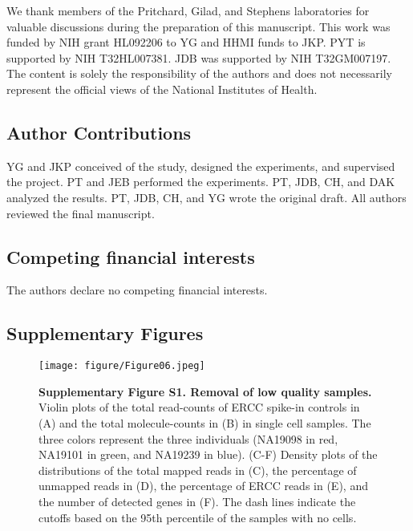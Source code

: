 We thank members of the Pritchard, Gilad, and Stephens laboratories for
valuable discussions during the preparation of this manuscript. This
work was funded by NIH grant HL092206 to YG and HHMI funds to JKP. PYT
is supported by NIH T32HL007381. JDB was supported by NIH T32GM007197.
The content is solely the responsibility of the authors and does not
necessarily represent the official views of the National Institutes of
Health.

\subsection{Author Contributions}\label{author-contributions}

YG and JKP conceived of the study, designed the experiments, and
supervised the project. PT and JEB performed the experiments. PT, JDB,
CH, and DAK analyzed the results. PT, JDB, CH, and YG wrote the original
draft. All authors reviewed the final manuscript.

\subsection{Competing financial
interests}\label{competing-financial-interests}

The authors declare no competing financial interests.

\subsection{Supplementary Figures}\label{supplementary-figures}

\begin{figure}[htbp]
\centering
\texttt{[image: figure/Figure06.jpeg]}
\caption{\textbf{Supplementary Figure S1. Removal of low quality
samples.} Violin plots of the total read-counts of ERCC spike-in
controls in (A) and the total molecule-counts in (B) in single cell
samples. The three colors represent the three individuals (NA19098 in
red, NA19101 in green, and NA19239 in blue). (C-F) Density plots of the
distributions of the total mapped reads in (C), the percentage of
unmapped reads in (D), the percentage of ERCC reads in (E), and the
number of detected genes in (F). The dash lines indicate the cutoffs
based on the 95th percentile of the samples with no cells.}
\end{figure}

